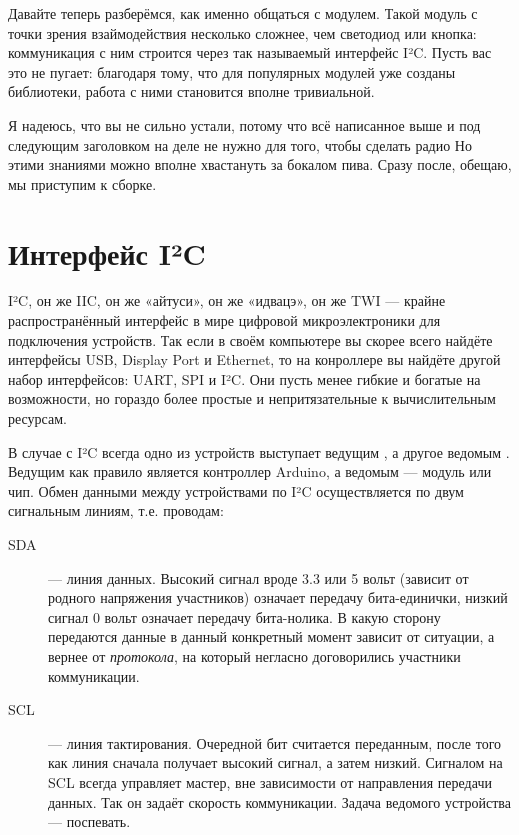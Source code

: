Давайте теперь разберёмся, как именно общаться с модулем. Такой модуль с точки зрения взаймодействия несколько сложнее, чем светодиод или кнопка: коммуникация с ним строится через так называемый интерфейс I²C. Пусть вас это не пугает: благодаря тому, что для популярных модулей уже созданы библиотеки, работа с ними становится вполне тривиальной.

\begin{Note}
  Я надеюсь, что вы не сильно устали, потому что всё написанное выше и под следующим заголовком на деле не нужно для того, чтобы сделать радио  Но этими знаниями можно вполне хвастануть за бокалом пива. Сразу после, обещаю, мы приступим к сборке.
\end{Note}

\section{Интерфейс I²C}
\label{I2C}

I²C, он же IIC, он же «айтуси», он же «идвацэ», он же TWI — крайне распространённый интерфейс в мире цифровой микроэлектроники для подключения устройств. Так если в своём компьютере вы скорее всего найдёте интерфейсы USB, Display Port и Ethernet, то на конроллере вы найдёте другой набор интерфейсов: UART, SPI и I²C. Они пусть менее гибкие и богатые на возможности, но гораздо более простые и непритязательные к вычислительным ресурсам.

В случае с I²C всегда одно из устройств выступает ведущим , а другое ведомым . Ведущим как правило является контроллер Arduino, а ведомым — модуль или чип. Обмен данными между устройствами по I²C осуществляется по двум сигнальным линиям, т.е. проводам:

\begin{description}
  \item [SDA] — линия данных. Высокий сигнал вроде 3.3 или 5 вольт (зависит от родного напряжения участников) означает передачу бита-единички, низкий сигнал 0 вольт означает передачу бита-нолика. В какую сторону передаются данные в данный конкретный момент зависит от ситуации, а вернее от \emph{протокола}, на который негласно договорились участники коммуникации.
  \item [SCL] — линия тактирования. Очередной бит считается переданным, после того как линия сначала получает высокий сигнал, а затем низкий. Сигналом на SCL всегда управляет мастер, вне зависимости от направления передачи данных. Так он задаёт скорость коммуникации. Задача ведомого устройства — поспевать.
\end{description}

